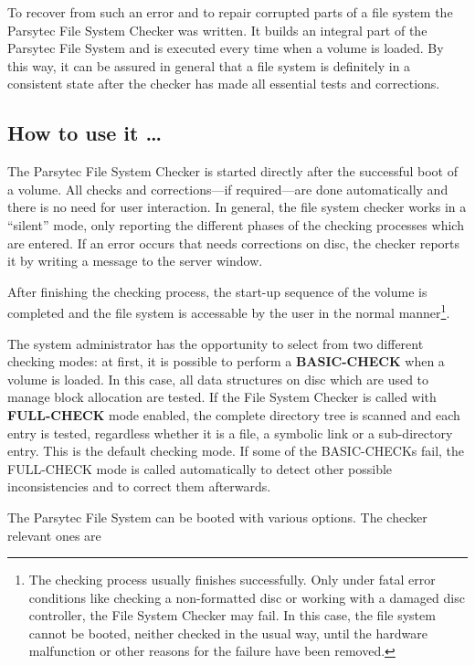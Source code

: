 To recover from such an error and to repair corrupted parts of a file system the
Parsytec File System Checker was written. It builds an integral part of the 
Parsytec File System and is executed every time when a volume is loaded. By this
way, it can be assured in general that a file system is definitely in a 
consistent state after the checker has made all essential tests and corrections.

\subsection{How to use it \ldots}

The Parsytec File System Checker is started directly after the successful boot 
of a volume. All checks and corrections---if required---are done automatically
and there is no need for user interaction. In general, the file system checker 
works in a ``silent'' mode, only reporting the different phases of the 
checking processes which are entered. If an error occurs that needs 
corrections on disc, the checker reports it by writing a message to the server
window.

After finishing the checking process, the start-up sequence of the volume
is completed and the file system is accessable by the user in the normal 
manner\footnote{The checking process usually finishes successfully. Only under 
fatal error conditions like checking a non-formatted disc or working with a 
damaged disc controller, the File System Checker may fail. In this case, the 
file system cannot be booted, neither checked in the usual way, until the 
hardware malfunction or other reasons for the failure have been removed.}.

The system administrator has the opportunity to select from two different 
checking modes: at first, it is possible to perform a 
{\bf BASIC-CHECK} when a volume is loaded. In this
case, all data structures on disc which are used to manage block allocation are
tested. If the File System Checker is called with 
{\bf FULL-CHECK} mode enabled, the complete 
directory tree is scanned and each entry is tested, regardless whether it is a 
file, a symbolic link or a sub-directory entry. This is the default checking 
mode. If some of the BASIC-CHECKs fail, the FULL-CHECK mode is called 
automatically to detect other possible inconsistencies and to correct them 
afterwards.

The Parsytec File System can be booted with various options. The checker 
relevant ones are

